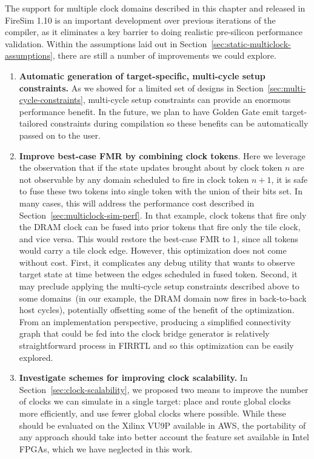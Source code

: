 The support for multiple clock domains described in this chapter and released
in FireSim 1.10 is an important development over previous iterations of the
compiler, as it eliminates a key barrier to doing realistic pre-silicon
performance validation.  Within the assumptions laid out in
Section~\ref{sec:static-multiclock-assumptions}, there are still a number of
improvements we could explore.

\begin{enumerate}
    \item  \textbf{Automatic generation of target-specific, multi-cycle setup constraints.} As we
showed for a limited set of designs in
Section~\ref{sec:multi-cycle-constraints}, multi-cycle setup constraints can
provide an enormous performance benefit. In the future, we plan to have Golden Gate emit target-tailored
constraints during compilation so these benefits can be automatically passed
on to the user.

\item \textbf{Improve best-case FMR by combining clock tokens}. Here we leverage the observation that if the state
updates brought about by clock token $n$ are not observable by any domain
scheduled to fire in clock token $n+1$, it is safe to fuse these two tokens
into single token with the union of their bits set. In many cases, this will
address the performance cost described in
Section~\ref{sec:multiclock-sim-perf}. In that example, clock tokens that fire
only the DRAM clock can be fused into prior tokens that fire only the tile clock,
and vice versa. This would restore the best-case FMR to 1, since all
tokens would carry a tile clock edge. However, this optimization does not come without cost. First, it complicates any debug utility that wants to observe target
state at time between the edges scheduled in fused token. Second, it may
preclude applying the multi-cycle setup constraints described above to some
domains~(in our example, the DRAM domain now fires in back-to-back host cycles),
potentially offsetting some of the benefit of the optimization. From an
implementation perspective, producing a simplified connectivity graph that
could be fed into the clock bridge generator is relatively straightforward
process in FIRRTL and so this optimization can be easily explored.

\item \textbf{Investigate schemes for improving clock scalability.}
In Section~\ref{sec:clock-scalability}, we proposed two means to improve the
number of clocks we can simulate in a single target: place and route global
clocks more efficiently, and use fewer global clocks where possible.
While these should be evaluated on the Xilinx VU9P available in AWS,
the portability of any approach should take into better account the
feature set available in Intel FPGAs, which we have neglected in this
work.


\end{enumerate}
